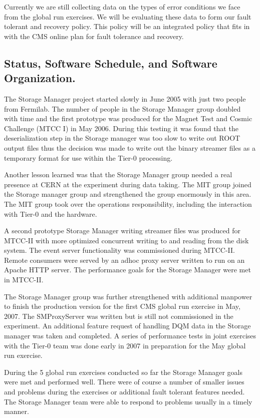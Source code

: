 Currently we are still collecting data on the types of error conditions we
face from the global run exercises. We will be evaluating these data to 
form our fault tolerant and recovery
policy. This policy will be an integrated policy that fits in with the CMS
online plan for fault tolerance and recovery.


\subsection{Status, Software Schedule, and Software Organization.}

The Storage Manager project started slowly in June 2005 with just two people
from Fermilab. The number of people in the Storage Manager group doubled with time
and the first prototype was produced for the Magnet Test and Cosmic Challenge (MTCC I)
in May 2006.
During this testing it was found that the deserialization step in the Storage manager was
too slow to write out ROOT output  files thus the decision was made to write out
the binary streamer files as a temporary format for use within the Tier-0 processing.

Another lesson learned was that the Storage Manager group needed a real presence
at CERN at the experiment during data taking. The MIT group joined the Storage manager
group and strengthened the group enormously in this area. 
The MIT group took over the operations
responsibility, including the interaction with Tier-0 and the hardware.

A second prototype Storage Manager writing streamer files was produced for MTCC-II
with more optimized concurrent writing to and reading from the disk system. The event
server functionality was commissioned during MTCC-II. Remote consumers were
served by an adhoc proxy server written to run on an Apache HTTP server.
The performance goals for the Storage Manager were met in MTCC-II.

The Storage Manager group was further strengthened with additional manpower
to finish the production version for the first CMS global run exercise in May, 2007.
The SMProxyServer was written but is still not commissioned in the experiment.
An additional feature request of handling DQM data in the Storage manager was
taken and completed.
A series of performance tests in joint exercises with the Tier-0 team was done early in 2007
in preparation for the May global run exercise.

During the 5 global run exercises conducted so far the Storage Manager goals
were met and performed well. There were of course a number of smaller 
issues and problems during the exercises or additional fault tolerant
features needed. The Storage Manager team were able to respond to problems
usually in a timely manner.


